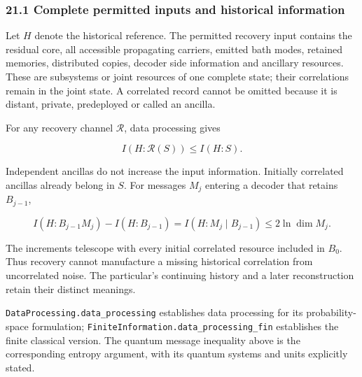 \documentclass[
]{article}
\begin{document}
\subsubsection{21.1 Complete permitted inputs and historical
information}\label{complete-permitted-inputs-and-historical-information}

Let \(H\) denote the historical reference. The permitted recovery input
contains the residual core, all accessible propagating carriers, emitted
bath modes, retained memories, distributed copies, decoder side
information and ancillary resources. These are subsystems or joint
resources of one complete state; their correlations remain in the joint
state. A correlated record cannot be omitted because it is distant,
private, predeployed or called an ancilla.

For any recovery channel \(\mathcal R\), data processing gives

\[
I(H:\mathcal R(S))\le I(H:S).
\]

Independent ancillas do not increase the input information. Initially
correlated ancillas already belong in \(S\). For messages \(M_j\)
entering a decoder that retains \(B_{j-1}\),

\[
I(H:B_{j-1}M_j)-I(H:B_{j-1})
=I(H:M_j\mid B_{j-1})\le2\ln\dim M_j.
\]

The increments telescope with every initial correlated resource included
in \(B_0\). Thus recovery cannot manufacture a missing historical
correlation from uncorrelated noise. The particular's continuing history
and a later reconstruction retain their distinct meanings.

\texttt{D\allowbreak{}a\allowbreak{}t\allowbreak{}a\allowbreak{}P\allowbreak{}r\allowbreak{}o\allowbreak{}c\allowbreak{}e\allowbreak{}s\allowbreak{}s\allowbreak{}i\allowbreak{}n\allowbreak{}g\allowbreak{}.\allowbreak{}d\allowbreak{}a\allowbreak{}t\allowbreak{}a\allowbreak{}\_\allowbreak{}p\allowbreak{}r\allowbreak{}o\allowbreak{}c\allowbreak{}e\allowbreak{}s\allowbreak{}s\allowbreak{}i\allowbreak{}n\allowbreak{}g}
establishes data processing for its probability-space formulation;
\texttt{F\allowbreak{}i\allowbreak{}n\allowbreak{}i\allowbreak{}t\allowbreak{}e\allowbreak{}I\allowbreak{}n\allowbreak{}f\allowbreak{}o\allowbreak{}r\allowbreak{}m\allowbreak{}a\allowbreak{}t\allowbreak{}i\allowbreak{}o\allowbreak{}n\allowbreak{}.\allowbreak{}d\allowbreak{}a\allowbreak{}t\allowbreak{}a\allowbreak{}\_\allowbreak{}p\allowbreak{}r\allowbreak{}o\allowbreak{}c\allowbreak{}e\allowbreak{}s\allowbreak{}s\allowbreak{}i\allowbreak{}n\allowbreak{}g\allowbreak{}\_\allowbreak{}f\allowbreak{}i\allowbreak{}n}
establishes the finite classical version. The quantum message inequality
above is the corresponding entropy argument, with its quantum systems
and units explicitly stated.
\end{document}
